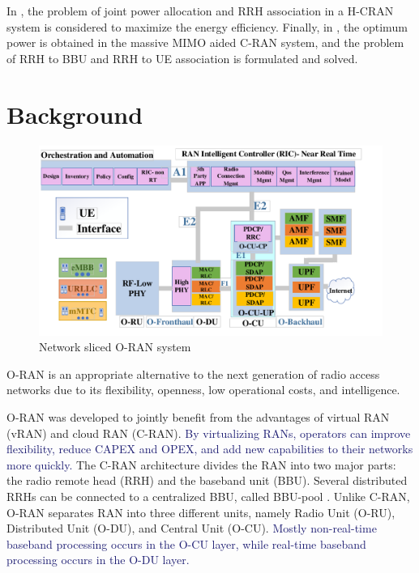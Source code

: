 \documentclass[lettersize,journal]{IEEEtran}
\begin{document}
In \cite{ali2019energy,ali2018joint}, the problem of joint power allocation and RRH association in a H-CRAN system is considered to maximize the energy efficiency.
Finally, in \cite{amani2019power}, the optimum power is obtained in the massive MIMO aided C-RAN system, and the problem of RRH to BBU and RRH to UE association is formulated and solved. 
\section{Background}\label{BG}
\begin{figure}
  \centering
  \captionsetup{justification=centering}
    \includegraphics[scale = 0.36]{finalDraw1.pdf}
  \caption{Network sliced O-RAN system}
  \label{fig:c11}
\end{figure}
O-RAN is an appropriate alternative to the next generation of radio access networks due to its flexibility, openness, low operational costs, and intelligence. 

O-RAN was developed to jointly benefit from the advantages of virtual RAN (vRAN) and cloud RAN (C-RAN).  \textcolor{MidnightBlue}{By virtualizing RANs, operators can improve flexibility, reduce CAPEX and OPEX, and add new capabilities to their networks more quickly.} The C-RAN architecture divides the RAN into two major parts: the radio remote head (RRH) and the baseband unit (BBU). Several distributed RRHs can be connected to a centralized BBU, called BBU-pool \cite{han2019research}. Unlike C-RAN, O-RAN separates RAN into three different units, namely Radio Unit (O-RU), Distributed Unit (O-DU), and Central Unit (O-CU).
 \textcolor{MidnightBlue}{Mostly non-real-time baseband processing occurs in the O-CU layer, while real-time baseband processing occurs in the O-DU layer.}
\end{document}
